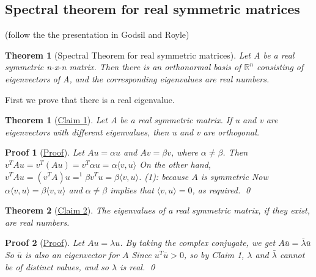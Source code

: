 \documentclass[11pt,a4paper]{report}
\newcommand\tab[1][1cm]{\hspace*{#1}}
\theoremstyle{theoremdd}
\newtheorem{thmd}{Theorem}[section]
\theoremstyle{claims1}
\newtheorem{claimsyay}{Theorem}[section]
\theoremstyle{proofs1}
\newtheorem{proofwrite}{Proof}[section]
\begin{document}
\subsection{Spectral theorem for real symmetric matrices}
(follow the the presentation in Godsil and Royle)

\begin{thmd}[Spectral Theorem for real symmetric matrices]
	Let A be a real symmetric n-x-n matrix. Then there is an orthonormal basis of $\mathbb{R}^n$ consisting of eigenvectors of A, and the corresponding eigenvalues are real numbers.
\end{thmd}
\noindent First we prove that there is a real eigenvalue.

\begin{claimsyay}[\underline{Claim 1}]
	Let A be a real symmetric matrix. \newline\indent\indent If u and v are eigenvectors with different eigenvalues, then u and v are orthogonal.
\end{claimsyay}

\begin{proofwrite}[\underline{Proof}]
	Let $Au=\alpha u$ and $Av = \beta v$, where $\alpha \ne \beta$. \newline\indent
	Then $v^T Au = v^T (Au) = v^T\alpha u = \alpha\langle v,u\rangle$ \newline\indent
	On the other hand, $v^T Au = (v^T A)u =^{1} \beta v^T u = \beta\langle v, u\rangle$. \newline\indent\tab (1): because $A$ is symmetric \newline\indent
	Now $\alpha\langle v, u\rangle = \beta\langle v, u\rangle$ and $\alpha\ne\beta$ implies that $\langle v,u\rangle = 0$, as required. \qed
\end{proofwrite}

\begin{claimsyay}[\underline{Claim 2}]
	The eigenvalues of a real symmetric matrix, if they exist, are real numbers.
\end{claimsyay}

\begin{proofwrite}[\underline{Proof}]
	Let $Au = \lambda u$. By taking the complex conjugate, we get $A\bar{u} = \bar{\lambda}\bar{u}$\newline\indent
	So $\bar{u}$ is also an eigenvector for $A$
	Since $u^T\bar{u} > 0$, so by Claim 1, $\lambda$ and $\bar{\lambda}$ cannot be of distinct values, and so $\lambda$ is real. \qed
\end{proofwrite}
\end{document}
